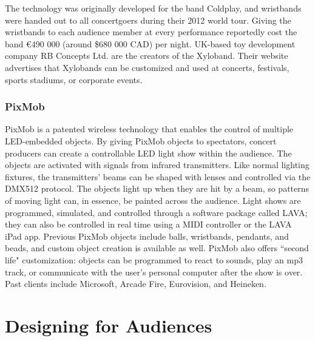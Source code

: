 The technology was originally developed for the band Coldplay, and wristbands were handed out to all concertgoers during their 2012 world tour. Giving the wristbands to each audience member at every performance reportedly cost the band \euro{}490 000 (around \$680 000 CAD) per night. UK-based toy development company RB Concepts Ltd. are the creators of the Xyloband. Their website advertises that Xylobands can be customized and used at concerts, festivals, sports stadiums, or corporate events.

\subsubsection{PixMob}

PixMob is a patented wireless technology that enables the control of multiple LED-embedded objects. By giving PixMob objects to spectators, concert producers can create a controllable LED light show within the audience. The objects are activated with signals from infrared transmitters. Like normal lighting fixtures, the transmitters' beams can be shaped with lenses and controlled via the DMX512 protocol. The objects light up when they are hit by a beam, so patterns of moving light can, in essence, be painted across the audience. Light shows are programmed, simulated, and controlled through a software package called LAVA; they can also be controlled in real time using a MIDI controller or the LAVA iPad app. Previous PixMob objects include balls, wristbands, pendants, and beads, and custom object creation is available as well. PixMob also offers ``second life" customization: objects can be programmed to react to sounds, play an mp3 track, or communicate with the user's personal computer after the show is over. Past clients include Microsoft, Arcade Fire, Eurovision, and Heineken.


\section{Designing for Audiences}

